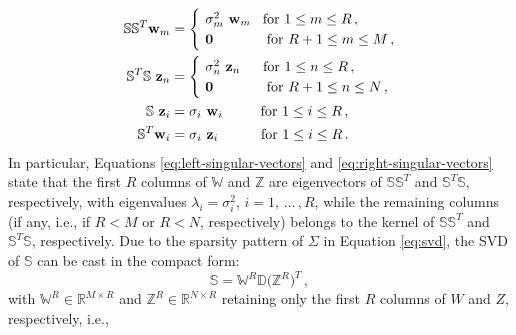 \documentclass[12pt, a4paper, twoside, openright]{report}
\numberwithin{equation}{chapter}
\theoremstyle{theorem}
\theoremstyle{definition}
\theoremstyle{remark}
\theoremstyle{proposition}
\numberwithin{figure}{chapter}
\begin{document}
		\begin{align}
			\label{eq:left-singular-vectors}
			\mathbb{S} \mathbb{S}^T \mathbf{w}_m & = 
			\begin{cases}
				& \hspace*{-0.3cm} \sigma_m^2 ~ \mathbf{w}_m \hspace*{0.3cm} \text{for $1 \leq m \leq R$} \, , \\
				& \hspace*{-0.3cm} \mathbf{0} \hspace*{1.34cm} \text{for $R+1 \leq m \leq M$} \, ,
			\end{cases} \\
			\label{eq:right-singular-vectors}
			\mathbb{S}^T \mathbb{S} ~ \mathbf{z}_n & =
			\begin{cases}
				& \hspace*{-0.3cm} \sigma_n^2 ~ \mathbf{z}_n \hspace*{0.57cm} \text{for $1 \leq n \leq R$} \, , \\
				& \hspace*{-0.3cm} \mathbf{0} \hspace*{1.34cm} \text{for $R+1 \leq n \leq N$} \, ,
			\end{cases} \\
			\label{eq:snapshot-method}
			\mathbb{S} ~ \mathbf{z}_i & = \sigma_i ~ \mathbf{w}_i \hspace*{0.95cm} \text{for $1 \leq i \leq R$} \, , \\
			\mathbb{S}^T \mathbf{w}_i & = \sigma_i ~ \mathbf{z}_i \hspace*{1.07cm} \text{for $1 \leq i \leq R$} \, .
		\end{align}
		In particular, Equations \eqref{eq:left-singular-vectors} and \eqref{eq:right-singular-vectors} state that the first $R$ columns of $\mathbb{W}$ and $\mathbb{Z}$ are eigenvectors of $\mathbb{S} \mathbb{S}^T$ and $\mathbb{S}^T \mathbb{S}$, respectively, with eigenvalues $\lambda_i = \sigma_i^2$, $i = 1, \, \ldots \, , R$, while the remaining columns (if any, i.e., if $R < M$ or $R < N$, respectively) belongs to the kernel of $\mathbb{S} \mathbb{S}^T$ and $\mathbb{S}^T \mathbb{S}$, respectively. Due to the sparsity pattern of $\Sigma$ in Equation \eqref{eq:svd}, the SVD of $\mathbb{S}$ can be cast in the compact form:
		\begin{equation}
			\label{eq:svd-compact}
			\mathbb{S} = \mathbb{W}^R \mathbb{D} \big( \mathbb{Z}^R \big) ^T \, ,
		\end{equation}
		with $\mathbb{W}^R \in \mathbb{R}^{M \times R}$ and $\mathbb{Z}^R \in \mathbb{R}^{N \times R}$ retaining only the first $R$ columns of $W$ and $Z$, respectively, i.e.,
\end{document}
